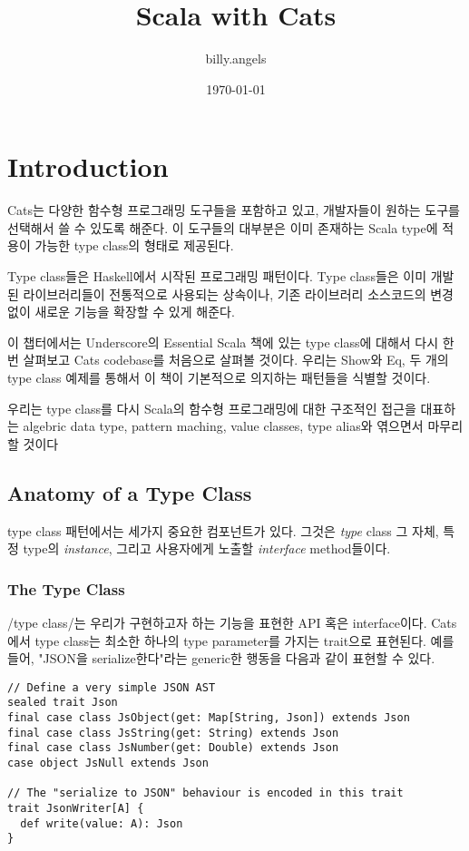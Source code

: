 \documentclass[a4paper]{article}
\author{billy.angels}
\date{\today}
\title{Scala with Cats}
\begin{document}
\maketitle
\tableofcontents



\section{Introduction}
\label{sec:orgb7c0f18}

Cats는 다양한 함수형 프로그래밍 도구들을 포함하고 있고, 개발자들이 원하는 도구를 선택해서 쓸 수 있도록 해준다. 이 도구들의 대부분은 이미 존재하는 Scala type에 적용이 가능한 type class의 형태로 제공된다.

Type class들은 Haskell에서 시작된 프로그래밍 패턴이다. Type class들은 이미 개발된 라이브러리들이 전통적으로 사용되는 상속이나, 기존 라이브러리 소스코드의 변경 없이 새로운 기능을 확장할 수 있게 해준다.

이 챕터에서는 Underscore의 Essential Scala 책에 있는 type class에 대해서 다시 한번 살펴보고 Cats codebase를 처음으로 살펴볼 것이다. 우리는 Show와 Eq, 두 개의 type class 예제를 통해서 이 책이 기본적으로 의지하는 패턴들을 식별할 것이다.

우리는 type class를 다시 Scala의 함수형 프로그래밍에 대한 구조적인 접근을 대표하는 algebric data type, pattern maching, value classes, type alias와 엮으면서 마무리할 것이다

\subsection{Anatomy of a Type Class}
\label{sec:org9ecc10c}

type class 패턴에서는 세가지 중요한 컴포넌트가 있다. 그것은 \emph{type} class 그 자체, 특정 type의 \emph{instance}, 그리고 사용자에게 노출할 \emph{interface} method들이다.

\subsubsection{The Type Class}
\label{sec:org6e90845}

/type class/는 우리가 구현하고자 하는 기능을 표현한 API 혹은 interface이다. Cats에서 type class는 최소한 하나의 type parameter를 가지는 trait으로 표현된다. 예를 들어, "JSON을 serialize한다"라는 generic한 행동을 다음과 같이 표현할 수 있다.

\begin{verbatim}
// Define a very simple JSON AST
sealed trait Json
final case class JsObject(get: Map[String, Json]) extends Json 
final case class JsString(get: String) extends Json
final case class JsNumber(get: Double) extends Json
case object JsNull extends Json

// The "serialize to JSON" behaviour is encoded in this trait
trait JsonWriter[A] {
  def write(value: A): Json
}
\end{verbatim}
\end{document}
